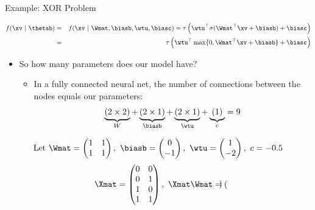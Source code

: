 \begin{vbframe}{Example: XOR Problem}
\begin{itemize}
  \end{itemize}
  \begin{eqnarray*}
    f(\xv~|~\thetab) &=& f(\xv~|~ \Wmat, \biasb, \wtu, \biasc) = \tau\left(\wtu^\top\sigma(\Wmat^\top \xv+\biasb)+\biasc\right) \\
                &=& \tau\left(\wtu^\top \max\{0, \Wmat^\top \xv+\biasb\} + \biasc\right)
  \end{eqnarray*}
  \begin{itemize}
    \item So how many parameters does our model have?
    \begin{itemize}
      \item In a fully connected neural net, the number of connections between the nodes equals our parameters: $$\underbrace{(2 \times 2)}_{W} + \underbrace{(2 \times 1)}_{\biasb} + \underbrace{(2 \times 1)}_{\wtu} + \underbrace{(1)}_{c} = 9$$
    \end{itemize}
  \end{itemize}
\framebreak
  \begin{eqnarray*}
   \text{Let} \ \Wmat = \begin{pmatrix}
      1 & 1 \\
      1 & 1
    \end{pmatrix}, \
      \biasb = \begin{pmatrix}
      0 \\
      -1
    \end{pmatrix}, \
      \wtu = \begin{pmatrix}
      1 \\
      -2
    \end{pmatrix}, \
      c = - 0.5
  \end{eqnarray*}
  \begin{eqnarray*}
    \Xmat = \begin{pmatrix}
      0 & 0 \\
      0 & 1 \\
      1 & 0 \\
      1 & 1
    \end{pmatrix}, \
    \Xmat \Wmat = \begin{pmatrix}

\end{pmatrix}
\end{eqnarray*}
\end{vbframe}
